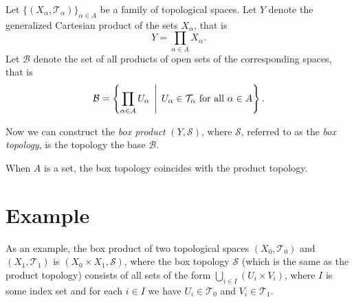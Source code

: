 \documentclass[12pt]{article}
\def\T{{\mathcal T}}
\def\B{{\mathcal B}}
\def\S{{\mathcal S}}
\begin{document}

Let $\{ (X_\alpha,\T_\alpha) \}_{\alpha\in A}$ 
be a family of topological spaces. 
Let $Y$ denote the generalized Cartesian product of the sets $X_\alpha$,
that is
\[
  Y = \prod_{\alpha\in A} X_\alpha.
\]
Let $\B$ denote the set of all products of open sets of the corresponding
spaces, that is
\[
  \B = \left\{ \prod_{\alpha\in A} U_\alpha \,\Biggm|\,
       U_\alpha\in\T_\alpha \text{ for all } \alpha\in A \right\}.
\]

Now we can construct the \emph{box product} $(Y,\S)$, where $\S$, 
referred to as the {\em box topology}, 
is the topology  the base $\B$.

When $A$ is a  set, 
the box topology coincides with the product topology.

\section*{Example}

As an example,
the box product of two topological spaces $(X_0,\T_0)$ and $(X_1,\T_1)$
is $(X_0\times X_1,\S)$,
where the box topology $\S$ (which is the same as the product topology)
consists of all sets of the form
$\bigcup_{i\in I}(U_i\times V_i)$,
where $I$ is some index set
and for each $i\in I$ we have $U_i\in\T_0$ and $V_i\in\T_1$.
\end{document}
